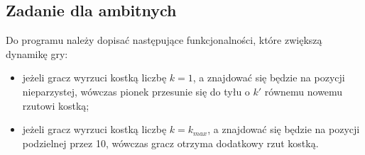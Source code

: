 \documentclass{article}
\begin{document}
	\subsection{Zadanie dla ambitnych}
	Do programu należy dopisać następujące funkcjonalności, które zwiększą dynamikę gry:
	\begin{itemize}
		\item jeżeli gracz wyrzuci kostką liczbę $k = 1$, a znajdować się będzie na pozycji nieparzystej, wówczas pionek przesunie się do tyłu o $k'$ równemu nowemu rzutowi kostką;
		\item jeżeli gracz wyrzuci kostką liczbę $k = k_{max}$, a znajdować się będzie na pozycji podzielnej przez 10, wówczas gracz otrzyma dodatkowy rzut kostką.
	\end{itemize}
\end{document}
